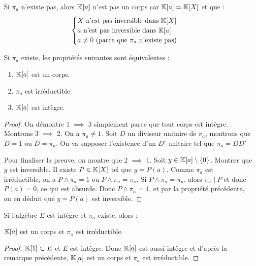\documentclass[11pt,a4paper]{report}
\begin{document}
\begin{remark}
    Si $\pi_a$ n'existe pas, alors $\mathbb{K}[a]$ n'est pas un corps car $\mathbb{K}[a] \simeq \mathbb{K}[X]$ et que :
    $$\begin{cases}
    X \text{ n'est pas inversible dans } \mathbb{K}[X] \\
    a \text{ n'est pas inversible dans } \mathbb{K}[a] \\
    a \ne 0 \text{ (parce que } \pi_a \text{ n'existe pas)}
    \end{cases}$$
\end{remark}

\begin{remark}
    Si $\pi_a$ existe, les propriétés suivantes sont équivalentes :
    \begin{enumerate}
        \item $\mathbb{K}[a]$ est un corps.
        \item $\pi_a$ est irréductible.
        \item $\mathbb{K}[a]$ est intègre.
    \end{enumerate}
\end{remark}

\begin{proof}
    On démontre 1 $\implies$ 3 simplement parce que tout corps est intègre. Montrons 3 $\implies$ 2. On a $\pi_a \ne 1$. Soit $D$ un diviseur unitaire de $\pi_a$, montrons que $D = 1$ ou $D = \pi_a$. On va supposer l'existence d'un $D'$ unitaire tel que $\pi_a = DD'$
    \todo

    
    Pour finaliser la preuve, on montre que 2 $\implies$ 1. Soit $y \in \mathbb{K}[a] \setminus \{0\}$. Montrer que $y$ est inversible. Il existe $P \in \mathbb{K}[X]$ tel que $y = P(a)$. Comme $\pi_a$ est irréductible, on a $P \wedge \pi_a = 1$ ou $P \wedge \pi_a = \pi_a$. Si $P \wedge \pi_a = \pi_a$, alors $\pi_a \mid P$ et donc $P(a) = 0$, ce qui est absurde. Donc $P \wedge \pi_a = 1$, et par la propriété précédente, on en déduit que $y = P(a)$ est inversible.
\end{proof}

\begin{remark}
    Si l'algèbre $E$ est intègre et $\pi_a$ existe, alors :
    
    $\mathbb{K}[a]$ est un corps et $\pi_a$ est irréductible. 
\end{remark}

\begin{proof}
    $\mathbb{K}[1] \subset E$ et $E$ est intègre. Donc $\mathbb{K}[a]$ est aussi intègre et d'après la remarque précédente, $\mathbb{K}[a]$ est un corps et $\pi_a$ est irréductible.
\end{proof}
\end{document}
